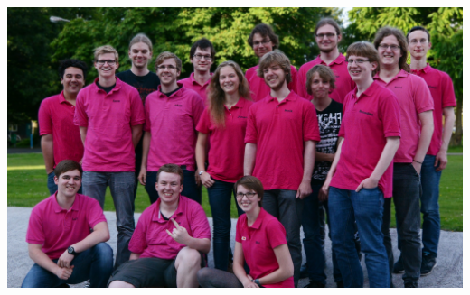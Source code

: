 \vfill
\begin{center}
	\vspace{-2mm}
	\includegraphics[width=\columnwidth, height=0.42\textheight]{res/fsphys_gruppenfoto_2016_recropped.jpg}
\end{center}

